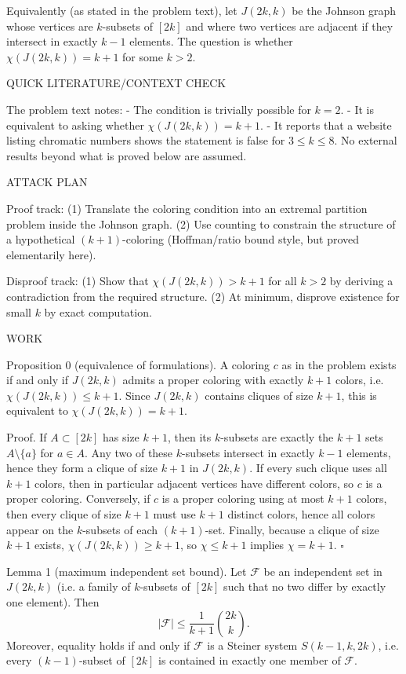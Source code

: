Equivalently (as stated in the problem text), let $J(2k,k)$ be the Johnson graph whose vertices are $k$-subsets of $[2k]$ and where two vertices are adjacent if they intersect in exactly $k-1$ elements.
The question is whether $\chi(J(2k,k))=k+1$ for some $k>2$.

QUICK LITERATURE/CONTEXT CHECK

The problem text notes:
- The condition is trivially possible for $k=2$.
- It is equivalent to asking whether $\chi(J(2k,k))=k+1$.
- It reports that a website listing chromatic numbers shows the statement is false for $3\le k\le 8$.
No external results beyond what is proved below are assumed.

ATTACK PLAN

Proof track:
(1) Translate the coloring condition into an extremal partition problem inside the Johnson graph.
(2) Use counting to constrain the structure of a hypothetical $(k+1)$-coloring (Hoffman/ratio bound style, but proved elementarily here).

Disproof track:
(1) Show that $\chi(J(2k,k))>k+1$ for all $k>2$ by deriving a contradiction from the required structure.
(2) At minimum, disprove existence for small $k$ by exact computation.

WORK

Proposition 0 (equivalence of formulations).
A coloring $c$ as in the problem exists if and only if $J(2k,k)$ admits a proper coloring with exactly $k+1$ colors, i.e. $\chi(J(2k,k))\le k+1$.
Since $J(2k,k)$ contains cliques of size $k+1$, this is equivalent to $\chi(J(2k,k))=k+1$.

Proof.
If $A\subset[2k]$ has size $k+1$, then its $k$-subsets are exactly the $k+1$ sets $A\setminus\{a\}$ for $a\in A$.
Any two of these $k$-subsets intersect in exactly $k-1$ elements, hence they form a clique of size $k+1$ in $J(2k,k)$.
If every such clique uses all $k+1$ colors, then in particular adjacent vertices have different colors, so $c$ is a proper coloring.
Conversely, if $c$ is a proper coloring using at most $k+1$ colors, then every clique of size $k+1$ must use $k+1$ distinct colors, hence all colors appear on the $k$-subsets of each $(k+1)$-set.
Finally, because a clique of size $k+1$ exists, $\chi(J(2k,k))\ge k+1$, so $\chi\le k+1$ implies $\chi=k+1$.
$\square$

Lemma 1 (maximum independent set bound).
Let $\mathcal{F}$ be an independent set in $J(2k,k)$ (i.e. a family of $k$-subsets of $[2k]$ such that no two differ by exactly one element).
Then
\[
|\mathcal{F}|\le \frac{1}{k+1}\binom{2k}{k}.
\]
Moreover, equality holds if and only if $\mathcal{F}$ is a Steiner system $S(k-1,k,2k)$, i.e. every $(k-1)$-subset of $[2k]$ is contained in exactly one member of $\mathcal{F}$.

